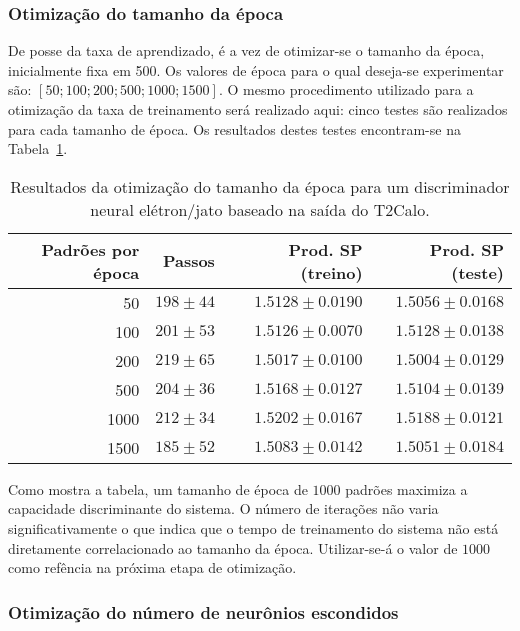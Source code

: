 \subsubsection{Otimização do tamanho da época}

De posse da taxa de aprendizado, é a vez de otimizar-se o tamanho da época,
inicialmente fixa em 500. Os valores de época para o qual deseja-se
experimentar são: $[50; 100; 200; 500; 1000; 1500]$. O mesmo procedimento
utilizado para a otimização da taxa de treinamento será realizado aqui: cinco
testes são realizados para cada tamanho de época. Os resultados destes testes
encontram-se na Tabela~\ref{tab:t2calo-neural-epoch-scan}.

\begin{table}
\begin{center}
\begin{tabular}{|r|r|r|r|} \hline
Padrões por época & Passos & Prod. SP (treino) & Prod. SP (teste) \\
\hline 
50 & $198\pm44$ & $1.5128\pm0.0190$ & $1.5056\pm0.0168$ \\ \hline
100 & $201\pm53$ & $1.5126\pm0.0070$ & $1.5128\pm0.0138$ \\ \hline
200 & $219\pm65$ & $1.5017\pm0.0100$ & $1.5004\pm0.0129$ \\ \hline
500 & $204\pm36$ & $1.5168\pm0.0127$ & $1.5104\pm0.0139$ \\ \hline
1000 & $212\pm34$ & $1.5202\pm0.0167$ & $1.5188\pm0.0121$ \\ \hline
1500 & $185\pm52$ & $1.5083\pm0.0142$ & $1.5051\pm0.0184$ \\ \hline
\end{tabular}
\end{center}
\caption{Resultados da otimização do tamanho da época para um discriminador
neural elétron/jato baseado na saída do T2Calo.}
\label{tab:t2calo-neural-epoch-scan}
\end{table}

Como mostra a tabela, um tamanho de época de $1000$ padrões maximiza a
capacidade discriminante do sistema. O número de iterações não varia
significativamente o que indica que o tempo de treinamento do sistema não está
diretamente correlacionado ao tamanho da época. Utilizar-se-á o valor de
$1000$ como refência na próxima etapa de otimização.

\subsubsection{Otimização do número de neurônios escondidos}

